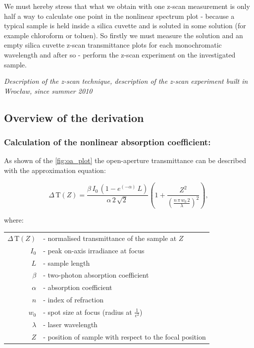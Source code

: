 \documentclass[12pt,twoside,a4paper]{article}
\numberwithin{equation}{subsection}
\numberwithin{figure}{subsection}
\begin{document}
We must hereby stress that what we obtain with one z-scan measurement is only half a way to calculate one point in the nonlinear
spectrum plot - because a typical sample is held inside a silica cuvette and is soluted in some solution (for example chloroform or
toluen). So firstly we must measure the solution and an empty silica cuvette z-scan transmittance plots for each monochromatic
wavelength and after so - perform the z-scan experiment on the investigated sample. 

\textit{Description of the z-scan technique, description of the z-scan experiment built in Wrocław, since summer 2010}

\subsection{Overview of the derivation} \label{chap:zscan_derivation}

\subsubsection*{Calculation of the nonlinear absorption coefficient:}

As shown of the \ref{fig:oa_plot} the open-aperture transmittance can be described with the approximation equation:

\begin{equation}
  \Delta \,\mathrm{T}(Z)=\frac {\beta \,{I_{0}}\,(1 - e^{( - \alpha )}\,L)}{\alpha \,2\,\sqrt{2}\,} 
  \left(  \! 1 + \frac {Z^{2}}{(\frac {n\,\pi \,{w_{0}}\,2}{\lambda })^{2}} \!  \right) ,
\end{equation}
 
where: 

\begin{tabular}{ r l }
   $\Delta \,\mathrm{T}(Z)$ & - normalised transmittance of the sample at $Z$ \\
   ${I_{0}}$ & - peak on-axis irradiance at focus \\
   $L$ & - sample length \\
   $\beta $ & - two-photon absorption coefficient \\
   $\alpha $ & - absorption coefficient \\
   $n$ & - index of refraction \\
   ${w_{0}}$ & - spot size at focus (radius at $\frac {1}{e^{2}}$) \\
   $\lambda $ & - laser wavelength \\
   $Z$ & - position of sample with respect to the focal position \\
\end{tabular}
\end{document}
